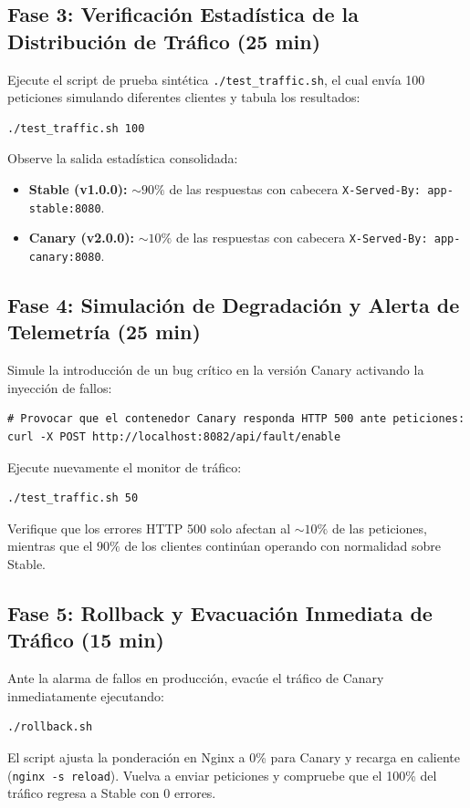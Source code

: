 \documentclass[10pt,letterpaper]{article}
\begin{document}
\subsection{Fase 3: Verificación Estadística de la Distribución de Tráfico (25 min)}
Ejecute el script de prueba sintética \texttt{./test\_traffic.sh}, el cual envía 100 peticiones simulando diferentes clientes y tabula los resultados:
\begin{lstlisting}[style=bashstyle]
./test_traffic.sh 100
\end{lstlisting}
Observe la salida estadística consolidada:
\begin{itemize}[itemsep=1pt]
  \item \textbf{Stable (v1.0.0):} $\sim 90\%$ de las respuestas con cabecera \texttt{X-Served-By: app-stable:8080}.
  \item \textbf{Canary (v2.0.0):} $\sim 10\%$ de las respuestas con cabecera \texttt{X-Served-By: app-canary:8080}.
\end{itemize}

\subsection{Fase 4: Simulación de Degradación y Alerta de Telemetría (25 min)}
Simule la introducción de un bug crítico en la versión Canary activando la inyección de fallos:
\begin{lstlisting}[style=bashstyle]
# Provocar que el contenedor Canary responda HTTP 500 ante peticiones:
curl -X POST http://localhost:8082/api/fault/enable
\end{lstlisting}

Ejecute nuevamente el monitor de tráfico:
\begin{lstlisting}[style=bashstyle]
./test_traffic.sh 50
\end{lstlisting}
Verifique que los errores HTTP 500 solo afectan al $\sim 10\%$ de las peticiones, mientras que el $90\%$ de los clientes continúan operando con normalidad sobre Stable.

\subsection{Fase 5: Rollback y Evacuación Inmediata de Tráfico (15 min)}
Ante la alarma de fallos en producción, evacúe el tráfico de Canary inmediatamente ejecutando:
\begin{lstlisting}[style=bashstyle]
./rollback.sh
\end{lstlisting}
El script ajusta la ponderación en Nginx a 0\% para Canary y recarga en caliente (\texttt{nginx -s reload}). Vuelva a enviar peticiones y compruebe que el 100\% del tráfico regresa a Stable con 0 errores.
\end{document}
